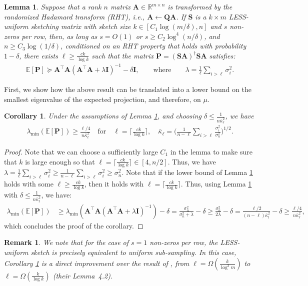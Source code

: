 \documentclass[11pt]{article}
\let\origtop\top
\renewcommand\top{{\scriptscriptstyle{\origtop}}}
\def\A{{\mathbf A}}
\def\I{{\mathbf I}}
\def\Q{{\mathbf Q}}
\def\S{{\mathbf S}}
\def\P{{\mathbf P}}
\def\E{{\mathds E}}
\def\R{{\mathbf R}}
\def\R{{\mathds R}}
\newtheorem{lem}[thm]{Lemma}
\newtheorem{cor}[thm]{Corollary}
\newtheorem{remark}[thm]{Remark}
\begin{document}
\begin{lem}\label{l:mu-less}
Suppose that a rank $n$ matrix $\A\in\R^{m\times n}$ is transformed by the randomized Hadamard transform (RHT), i.e., $\A\leftarrow \Q\A$. 
If $\S$ is a $k\times m$ LESS-uniform sketching matrix with sketch size $k\in[ C_1\log (m/\delta),n] $ and $s$ non-zeros per row, then, as long as $s=O(1)$ or $s \geq C_2\log^4(n/\delta)$, and $n \geq C_3 \log(1 / \delta)$, conditioned on an RHT property that holds with probability $1-\delta$, there exists $\ell\geq \frac{ck}{\log k}$ such that the matrix $\P=(\S\A)^{\dagger}\S\A$ satisfies:
\begin{align*}
\E[\P] \succeq\A^\top\A(\A^\top\A+\lambda\I)^{-1} - \delta\I,\qquad\text{where}\qquad \lambda = \frac1\ell\sum_{i>\ell}\sigma_i^2.
\end{align*}
\end{lem}
First, we show how the above result can be translated into a lower bound on the smallest eigenvalue of the expected projection, and therefore, on $\mu$.
\begin{cor}\label{c:mu-less}
    Under the assumptions of Lemma \ref{l:mu-less}, and choosing $\delta\leq \frac1{n\bar\kappa_\ell^2}$, we have
    \begin{align*}
        \lambda_{\min}(\E[\P]) \geq \frac{\ell/4}{n\bar\kappa_\ell^2}\quad\text{for}\quad \ell= \Big\lceil\frac{ck}{\log k}\Big\rceil,\quad \bar\kappa_\ell = \Big(\frac1{n-\ell}\sum_{i>\ell}\frac{\sigma_i^2}{\sigma_n^2}\Big)^{1/2}.
    \end{align*}
\end{cor}
\begin{proof}
 Note that we can choose a sufficiently large $C_1$ in the lemma to make sure that $k$ is large enough so that $\ell=\lceil\frac {ck}{\log k}\rceil\in[4,n/2]$. Thus, we have $\lambda = \frac1\ell\sum_{i>\ell}\sigma_i^2\geq \frac 1{n-\ell}\sum_{i>\ell}\sigma_i^2\geq \sigma_n^2$. Note that if the lower bound of Lemma \ref{l:mu-less} holds with some $\ell\geq \frac{ck}{\log k}$, then it holds with $\ell = \lceil\frac{ck}{\log k}\rceil$. Thus, using Lemma \ref{l:mu-less} with $\delta\leq \frac1{n\bar\kappa_\ell^2}$, we have:
 \begin{align*}
     \lambda_{\min}(\E[\P]) 
     &\geq \lambda_{\min}(\A^\top\A(\A^\top\A+\lambda\I)^{-1}) - \delta
     = \frac{\sigma_n^2}{\sigma_n^2 + \lambda} - \delta
     \geq \frac{\sigma_n^2}{2\lambda} - \delta
     =\frac{\ell/2}{(n-\ell)\bar\kappa_l^2}-\delta\geq \frac{\ell/4}{n\bar\kappa_\ell^2},
 \end{align*}
 which concludes the proof of the corollary.
\end{proof}
\begin{remark}
    We note that for the case of $s=1$ non-zeros per row, the LESS-uniform sketch is precisely equivalent to uniform sub-sampling. In this case, Corollary \ref{c:mu-less} is a direct improvement over the result of \cite{derezinski2023solving}, from 
    $\ell=\Omega(\frac {k}{\log^3 m})$ to $\ell=\Omega(\frac {k}{\log k})$ 
     (their Lemma~4.2).   
\end{remark}
\end{document}

